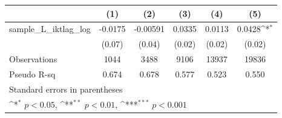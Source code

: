 {
\def\sym#1{\ifmmode^{#1}\else\(^{#1}\)\fi}
\begin{tabular}{l*{5}{c}}
\hline\hline
          &\multicolumn{1}{c}{(1)}         &\multicolumn{1}{c}{(2)}         &\multicolumn{1}{c}{(3)}         &\multicolumn{1}{c}{(4)}         &\multicolumn{1}{c}{(5)}         \\
\hline
sample\_L\_iktlag\_log&  -0.0175         & -0.00591         &   0.0335         &   0.0113         &   0.0428\sym{*}  \\
          &   (0.07)         &   (0.04)         &   (0.02)         &   (0.02)         &   (0.02)         \\
\hline
Observations&     1044         &     3488         &     9106         &    13937         &    19836         \\
Pseudo R-sq&    0.674         &    0.678         &    0.577         &    0.523         &    0.550         \\
\hline\hline
\multicolumn{6}{l}{\footnotesize Standard errors in parentheses}\\
\multicolumn{6}{l}{\footnotesize \sym{*} \(p<0.05\), \sym{**} \(p<0.01\), \sym{***} \(p<0.001\)}\\
\end{tabular}
}
